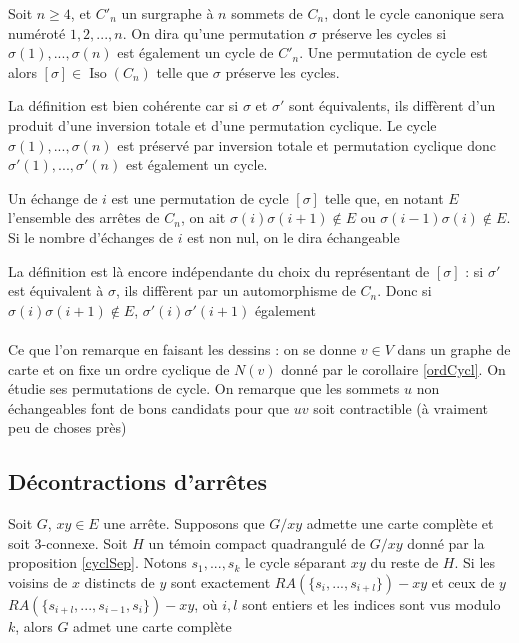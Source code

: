 \documentclass{scrartcl}
\begin{document}
\begin{flushleft}
\begin{def*}
    Soit $n \geq 4$, et $C'_n$ un surgraphe à $n$ sommets de $C_n$, dont le cycle canonique sera numéroté $1, 2, ..., n$.
    On dira qu'une permutation $\sigma$ préserve les cycles si $\sigma(1), ..., \sigma(n)$ est également un cycle de $C'_n$.
    Une permutation de cycle est alors $[\sigma] \in \operatorname*{Iso}(C_n)$ telle que $\sigma$ préserve les cycles.
\end{def*}

La définition est bien cohérente car si $\sigma$ et $\sigma'$ sont équivalents, ils diffèrent d'un produit d'une inversion totale
et d'une permutation cyclique. Le cycle $\sigma(1), ..., \sigma(n)$ est préservé par inversion totale et permutation cyclique donc
$\sigma'(1), ..., \sigma'(n)$ est également un cycle.

\begin{def*}[Echange]
    Un échange de $i$ est une permutation de cycle $[\sigma]$ telle que, en notant $E$ l'ensemble des arrêtes de $C_n$,
    on ait $\sigma(i)\sigma(i+1) \notin E$ ou $\sigma(i-1)\sigma(i) \notin E$. Si le nombre d'échanges de $i$ est non nul,
    on le dira échangeable
\end{def*}

La définition est là encore indépendante du choix du représentant de $[\sigma]$ : si $\sigma'$ est équivalent à $\sigma$,
ils diffèrent par un automorphisme de $C_n$. Donc si $\sigma(i)\sigma(i+1) \notin E$, $\sigma'(i)\sigma'(i+1)$ également
\\~\\
Ce que l'on remarque en faisant les dessins : on se donne $v \in V$ dans un graphe de carte et on fixe un ordre
cyclique de $N(v)$ donné par le corollaire \ref{ordCycl}. On étudie ses permutations de cycle. On remarque que les sommets
$u$ non échangeables font de bons candidats pour que $uv$ soit contractible (à vraiment peu de choses près)


\subsection{Décontractions d'arrêtes}

\begin{prop}\label{ezDecontr}
    Soit $G$, $xy \in E$ une arrête. Supposons que $G / xy$ admette une carte complète et soit $3$-connexe. Soit $H$ un témoin compact
    quadrangulé de $G / xy$ donné par la proposition \ref{cyclSep}. Notons $s_1, ..., s_k$ le cycle séparant $xy$ du reste de $H$.
    Si les voisins de $x$ distincts de $y$ sont exactement $RA(\{s_i, ..., s_{i+l}\}) - xy$ et ceux de $y$
    $RA(\{s_{i+l}, ..., s_{i-1}, s_i\}) - xy$,
    où $i, l$ sont entiers et les indices sont vus modulo $k$, alors $G$ admet une carte complète
\end{prop}


\end{flushleft}
\end{document}
